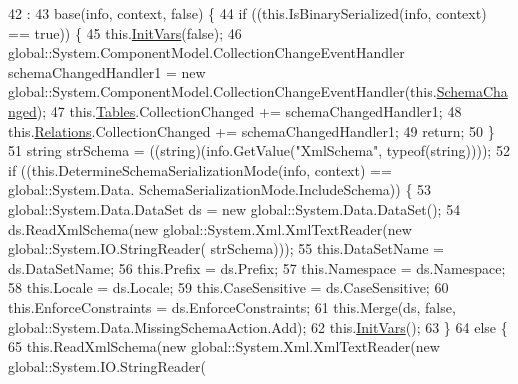 \begin{DoxyCode}
42                                                                                                            
                                                    : 
43                 base(info, context, \textcolor{keyword}{false}) \{
44             \textcolor{keywordflow}{if} ((this.IsBinarySerialized(info, context) == \textcolor{keyword}{true})) \{
45                 this.\hyperlink{class_asistencias__wpf_1_1_alumnos_data_set_a4cd12c7d20f4d68d13a2845029bb7831}{InitVars}(\textcolor{keyword}{false});
46                 global::System.ComponentModel.CollectionChangeEventHandler schemaChangedHandler1 = \textcolor{keyword}{new} 
      global::System.ComponentModel.CollectionChangeEventHandler(this.\hyperlink{class_asistencias__wpf_1_1_alumnos_data_set_a9d5e54c2f591f426d9cef8f1b11dbfdb}{SchemaChanged});
47                 this.\hyperlink{class_asistencias__wpf_1_1_alumnos_data_set_aa4ac49198eb7a8cd5730501fd92eaa0c}{Tables}.CollectionChanged += schemaChangedHandler1;
48                 this.\hyperlink{class_asistencias__wpf_1_1_alumnos_data_set_a0d4c947f0546161fe211244d255abcf8}{Relations}.CollectionChanged += schemaChangedHandler1;
49                 \textcolor{keywordflow}{return};
50             \}
51             \textcolor{keywordtype}{string} strSchema = ((string)(info.GetValue(\textcolor{stringliteral}{"XmlSchema"}, typeof(\textcolor{keywordtype}{string}))));
52             \textcolor{keywordflow}{if} ((this.DetermineSchemaSerializationMode(info, context) == global::System.Data.
      SchemaSerializationMode.IncludeSchema)) \{
53                 global::System.Data.DataSet ds = \textcolor{keyword}{new} global::System.Data.DataSet();
54                 ds.ReadXmlSchema(\textcolor{keyword}{new} global::System.Xml.XmlTextReader(\textcolor{keyword}{new} global::System.IO.StringReader(
      strSchema)));
55                 this.DataSetName = ds.DataSetName;
56                 this.Prefix = ds.Prefix;
57                 this.Namespace = ds.Namespace;
58                 this.Locale = ds.Locale;
59                 this.CaseSensitive = ds.CaseSensitive;
60                 this.EnforceConstraints = ds.EnforceConstraints;
61                 this.Merge(ds, \textcolor{keyword}{false}, global::System.Data.MissingSchemaAction.Add);
62                 this.\hyperlink{class_asistencias__wpf_1_1_alumnos_data_set_a4cd12c7d20f4d68d13a2845029bb7831}{InitVars}();
63             \}
64             \textcolor{keywordflow}{else} \{
65                 this.ReadXmlSchema(\textcolor{keyword}{new} global::System.Xml.XmlTextReader(\textcolor{keyword}{new} global::System.IO.StringReader(

\end{DoxyCode}
